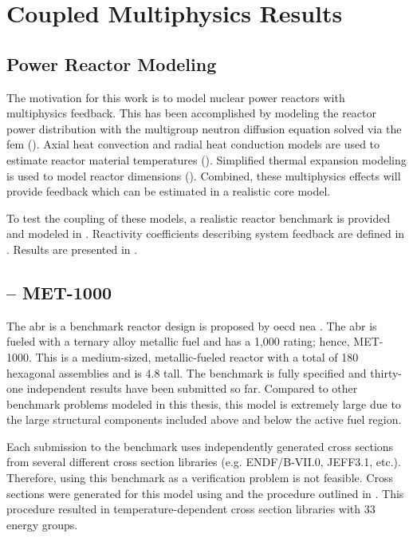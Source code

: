 \chapter{Coupled Multiphysics Results}
\label{ch:coupledResults}

\section{Power Reactor Modeling}
\label{sec:power_reactor_modeling}
  The motivation for this work is to model nuclear power reactors with
  multiphysics feedback. This has been accomplished by modeling the reactor
  power distribution with the multigroup neutron diffusion equation solved via
  the \gls{fem} (). Axial heat convection and radial
  heat conduction models are used to estimate reactor material temperatures
  ().  Simplified thermal expansion modeling is used
  to model reactor dimensions (). Combined, these
  multiphysics effects will provide feedback which can be estimated in a
  realistic core model.
  
  To test the coupling of these models, a realistic reactor benchmark is
  provided and modeled in . Reactivity coefficients describing 
  system feedback are defined in . Results are
  presented in .

\section{ -- MET-1000}
\label{sec:abr}
  The \gls{abr} is a benchmark reactor design is proposed by \gls{oecd}
  \gls{nea} \cite{abr}. The \gls{abr} is fueled with a ternary alloy metallic
  fuel and has a 1,000  rating; hence, MET-1000. This is a
  medium-sized, metallic-fueled reactor with a total of 180 hexagonal assemblies
  and is 4.8  tall.  The benchmark is fully specified and thirty-one
  independent results have been submitted so far. Compared to other benchmark
  problems modeled in this thesis, this model is extremely large due to the
  large structural components included above and below the active fuel region.
  
  Each submission to the benchmark uses independently generated cross sections
  from several different cross section libraries (e.g. ENDF/B-VII.0, JEFF3.1,
  etc.). Therefore, using this benchmark as a verification problem is not
  feasible. Cross sections were generated for this model using \mcc and the 
  procedure outlined in . This procedure
  resulted in temperature-dependent cross section libraries with 33 energy
  groups. 
  
